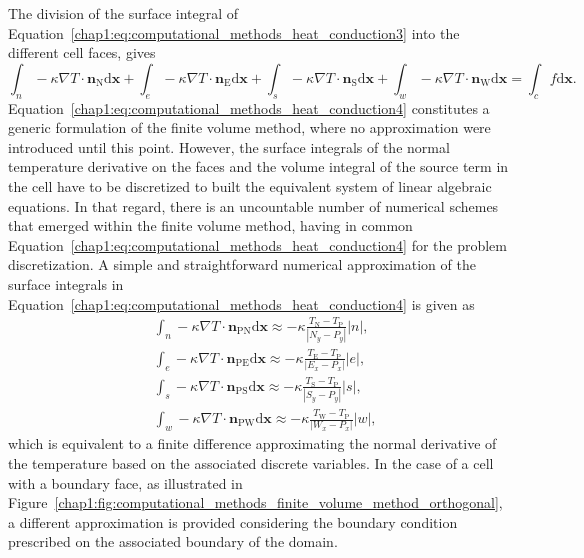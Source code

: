 The division of the surface integral of Equation~\cref{chap1:eq:computational_methods_heat_conduction3} into the different cell faces, gives
\begin{equation}
\int_{n}-\kappa\nabla T\cdot\bm{n}_{\textrm{N}}\textrm{d}\bm{x}+\int_{e}-\kappa\nabla T\cdot\bm{n}_{\textrm{E}}\textrm{d}\bm{x}+\int_{s}-\kappa\nabla T\cdot\bm{n}_{\textrm{S}}\textrm{d}\bm{x}+\int_{w}-\kappa\nabla T\cdot\bm{n}_{\textrm{W}}\textrm{d}\bm{x}=\int_{c}f\textrm{d}\bm{x}.
\label{chap1:eq:computational_methods_heat_conduction4}
\end{equation}
Equation~\cref{chap1:eq:computational_methods_heat_conduction4} constitutes a generic formulation of the finite volume method, where no approximation were introduced until this point.
However, the surface integrals of the normal temperature derivative on the faces and the volume integral of the source term in the cell have to be discretized to built the equivalent system of linear algebraic equations.
In that regard, there is an uncountable number of numerical schemes that emerged within the finite volume method, having in common Equation~\cref{chap1:eq:computational_methods_heat_conduction4} for the problem discretization.
A simple and straightforward numerical approximation of the surface integrals in Equation~\cref{chap1:eq:computational_methods_heat_conduction4} is given as
\begin{align}
&\int_{n}-\kappa\nabla T\cdot\bm{n}_{\textrm{PN}}\textrm{d}\bm{x}\approx -\kappa\frac{T_{\textrm{N}}-T_{\textrm{P}}}{\left\vert N_{y}-P_{y}\right\vert}\left\vert n\right\vert,\\
&\int_{e}-\kappa\nabla T\cdot\bm{n}_{\textrm{PE}}\textrm{d}\bm{x}\approx -\kappa\frac{T_{\textrm{E}}-T_{\textrm{P}}}{\left\vert E_{x}-P_{x}\right\vert}\left\vert e\right\vert,\\
&\int_{s}-\kappa\nabla T\cdot\bm{n}_{\textrm{PS}}\textrm{d}\bm{x}\approx -\kappa\frac{T_{\textrm{S}}-T_{\textrm{P}}}{\left\vert S_{y}-P_{y}\right\vert}\left\vert s\right\vert,\\
&\int_{w}-\kappa\nabla T\cdot\bm{n}_{\textrm{PW}}\textrm{d}\bm{x}\approx -\kappa\frac{T_{\textrm{W}}-T_{\textrm{P}}}{\left\vert W_{x}-P_{x}\right\vert}\left\vert w\right\vert,
\end{align}
which is equivalent to a finite difference approximating the normal derivative of the temperature based on the associated discrete variables.
In the case of a cell with a boundary face, as illustrated in Figure~\ref{chap1:fig:computational_methods_finite_volume_method_orthogonal}, a different approximation is provided considering the boundary condition prescribed on the associated boundary of the domain.

